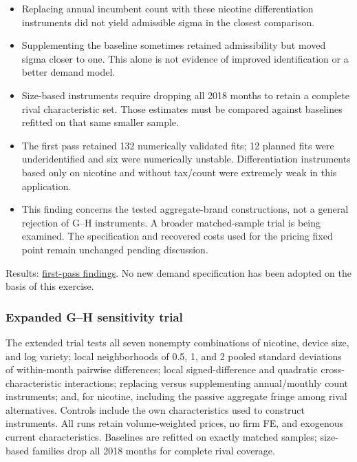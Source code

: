 \documentclass[10pt,]{article}
\providecommand{\tightlist}{%
  \setlength{\itemsep}{0pt}\setlength{\parskip}{0pt}}
\begin{document}
\begin{itemize}
\tightlist
\item
  Replacing annual incumbent count with these nicotine differentiation
  instruments did not yield admissible sigma in the closest comparison.
\item
  Supplementing the baseline sometimes retained admissibility but moved
  sigma closer to one. This alone is not evidence of improved
  identification or a better demand model.
\item
  Size-based instruments require dropping all 2018 months to retain a
  complete rival characteristic set. Those estimates must be compared
  against baselines refitted on that same smaller sample.
\item
  The first pass retained 132 numerically validated fits; 12 planned
  fits were underidentified and six were numerically unstable.
  Differentiation instruments based only on nicotine and without
  tax/count were extremely weak in this application.
\item
  This finding concerns the tested aggregate-brand constructions, not a
  general rejection of G--H instruments. A broader matched-sample trial
  is being examined. The specification and recovered costs used for the
  pricing fixed point remain unchanged pending discussion.
\end{itemize}

Results:
\href{../../output/demand_estimation/gandhi_houde_2026-11-02/findings.txt}{first-pass
findings}. No new demand specification has been adopted on the basis of
this exercise.

\subsubsection{Expanded G--H sensitivity
trial}\label{expanded-gh-sensitivity-trial}

The extended trial tests all seven nonempty combinations of nicotine,
device size, and log variety; local neighborhoods of 0.5, 1, and 2
pooled standard deviations of within-month pairwise differences; local
signed-difference and quadratic cross-characteristic interactions;
replacing versus supplementing annual/monthly count instruments; and,
for nicotine, including the passive aggregate fringe among rival
alternatives. Controls include the own characteristics used to construct
instruments. All runs retain volume-weighted prices, no firm FE, and
exogenous current characteristics. Baselines are refitted on exactly
matched samples; size-based families drop all 2018 months for complete
rival coverage.
\end{document}
